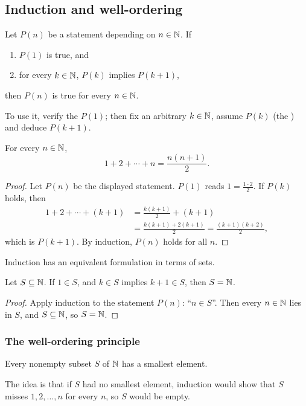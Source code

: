 \subsection{Induction and well-ordering}
\begin{axiom}
  Let $P(n)$ be a statement depending on $n \in \mathbb{N}$. If
  \begin{enumerate}
    \item $P(1)$ is true, and
    \item for every $k \in \mathbb{N}$, $P(k)$ implies $P(k + 1)$,
  \end{enumerate}
  then $P(n)$ is true for every $n \in \mathbb{N}$.
\end{axiom}
To use it, verify the  $P(1)$; then fix an arbitrary
$k \in \mathbb{N}$, assume $P(k)$ (the ) and deduce
$P(k + 1)$.

\begin{prop}
  For every $n \in \mathbb{N}$,
  \[
    1 + 2 + \cdots + n = \frac{n(n + 1)}{2}.
  \]
\end{prop}

\begin{proof}
  Let $P(n)$ be the displayed statement. $P(1)$ reads
  $1 = \frac{1 \cdot 2}{2}$. If $P(k)$ holds, then
  \begin{align*}
    1 + 2 + \cdots + (k + 1) &= \frac{k(k + 1)}{2} + (k + 1)\\
    &= \frac{k(k + 1) + 2(k + 1)}{2} = \frac{(k + 1)(k + 2)}{2},
  \end{align*}
  which is $P(k + 1)$. By induction, $P(n)$ holds for all $n$.
\end{proof}

Induction has an equivalent formulation in terms of sets.
\begin{prop}
  Let $S \subseteq \mathbb{N}$. If $1 \in S$, and $k \in S$ implies $k + 1 \in S$,
  then $S = \mathbb{N}$.
\end{prop}

\begin{proof}
  Apply induction to the statement $P(n)$: ``$n \in S$''. Then every
  $n \in \mathbb{N}$ lies in $S$, and $S \subseteq \mathbb{N}$, so $S = \mathbb{N}$.
\end{proof}

\subsubsection*{The well-ordering principle}
\begin{nthm}\label{thm:wop}
  Every nonempty subset $S$ of $\mathbb{N}$ has a smallest element.
\end{nthm}
The idea is that if $S$ had no smallest element, induction would show that
$S$ misses $1, 2, \ldots, n$ for every $n$, so $S$ would be empty.

